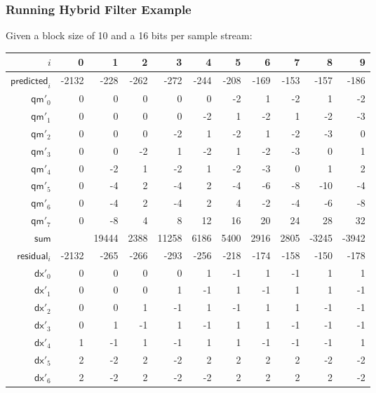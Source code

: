 \subsubsection{Running Hybrid Filter Example}
Given a \textsf{block size} of 10 and a 16 bits per sample stream:
\begin{table}[h]
  {
    \begin{tabular}{r|rrrrrrrrrr}
      $i$ & 0 & 1 & 2 & 3 & 4 & 5 & 6 & 7 & 8 & 9 \\
      \hline
      $\textsf{predicted}_i$ & -2132 & -228 & -262 & -272 & -244 & -208 & -169 & -153 & -157 & -186 \\
      \hline
      $\textsf{qm}'_{0}$ & 0 & 0 & 0 & 0 & 0 & -2 & 1 & -2 & 1 & -2 \\
      $\textsf{qm}'_{1}$ & 0 & 0 & 0 & 0 & -2 & 1 & -2 & 1 & -2 & -3 \\
      $\textsf{qm}'_{2}$ & 0 & 0 & 0 & -2 & 1 & -2 & 1 & -2 & -3 & 0 \\
      $\textsf{qm}'_{3}$ & 0 & 0 & -2 & 1 & -2 & 1 & -2 & -3 & 0 & 1 \\
      $\textsf{qm}'_{4}$ & 0 & -2 & 1 & -2 & 1 & -2 & -3 & 0 & 1 & 2 \\
      $\textsf{qm}'_{5}$ & 0 & -4 & 2 & -4 & 2 & -4 & -6 & -8 & -10 & -4 \\
      $\textsf{qm}'_{6}$ & 0 & -4 & 2 & -4 & 2 & 4 & -2 & -4 & -6 & -8 \\
      $\textsf{qm}'_{7}$ & 0 & -8 & 4 & 8 & 12 & 16 & 20 & 24 & 28 & 32 \\
      \hline
      $\textsf{sum}$ &  & 19444 & 2388 & 11258 & 6186 & 5400 & 2916 & 2805 & -3245 & -3942 \\
      \hline
      $\textsf{residual}_i$ & -2132 & -265 & -266 & -293 & -256 & -218 & -174 & -158 & -150 & -178 \\
      \hline
      $\textsf{dx}'_{0}$ & 0 & 0 & 0 & 0 & 1 & -1 & 1 & -1 & 1 & 1 \\
      $\textsf{dx}'_{1}$ & 0 & 0 & 0 & 1 & -1 & 1 & -1 & 1 & 1 & -1 \\
      $\textsf{dx}'_{2}$ & 0 & 0 & 1 & -1 & 1 & -1 & 1 & 1 & -1 & -1 \\
      $\textsf{dx}'_{3}$ & 0 & 1 & -1 & 1 & -1 & 1 & 1 & -1 & -1 & -1 \\
      $\textsf{dx}'_{4}$ & 1 & -1 & 1 & -1 & 1 & 1 & -1 & -1 & -1 & 1 \\
      $\textsf{dx}'_{5}$ & 2 & -2 & 2 & -2 & 2 & 2 & 2 & 2 & -2 & -2 \\
      $\textsf{dx}'_{6}$ & 2 & -2 & 2 & -2 & -2 & 2 & 2 & 2 & 2 & -2 \\

\end{tabular}}
\end{table}
